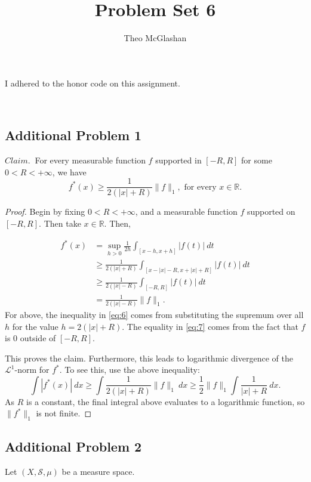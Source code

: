 \documentclass[12pt]{article}
\title{Problem Set 6}
\author{Theo McGlashan}
\date{}
\newcommand{\R}{\mathbb{R}}
\newcommand{\eq}[1]{\begin{equation*}#1\end{equation*}}
\newcommand{\qal}[1]{\begin{align}#1\end{align}}
\begin{document}
\maketitle

\begin{center}
    I adhered to the honor code on this assignment.
\end{center}

\newpage
\
\newpage

\subsection*{Additional Problem 1}

$Claim.~$ For every measurable function $f$ supported in $[-R, R]$ for some $0 < R < +\infty$, we have 
\eq{f^*(x) \geq \frac{1}{2(|x| + R)} \|f\|_1, \text{ for every } x \in \R.}

\begin{proof}
    Begin by fixing $0 < R < +\infty$, and a measurable function $f$ supported on $[-R, R]$. Then take $x \in \R$. Then,

    \qal{ f^*(x) &= \sup_{h > 0} \frac{1}{2h} \int_{[x-h, x+h]} |f(t)|~dt \nonumber \\
    & \geq \frac{1}{2(|x| + R)} \int_{[x - |x| - R, x + |x| + R]} |f(t)| ~dt \label{eq:6} \\
    & \geq \frac{1}{2(|x| - R)}\int_{[-R, R]} |f(t)| ~dt \nonumber \\
    & = \frac{1}{2(|x| - R)} \|f\|_1 \label{eq:7}.}
    For above, the inequality in \eqref{eq:6} comes from substituting the supremum over all $h$ for the value $h = 2(|x| + R)$. The equality in \eqref{eq:7} comes from the fact that $f$ is 0 outside of $[-R, R]$.

    This proves the claim. Furthermore, this leads to logarithmic divergence of the $\mathcal{L}^1$-norm for $f^*$. To see this, use the above inequality:
    \eq{\int |f^*(x)| ~dx \geq \int \frac{1}{2(|x| + R)}\|f\|_1~ dx \geq \frac{1}{2} \|f\|_1 \int \frac{1}{|x| + R} ~dx.}
    As $R$ is a constant, the final integral above evaluates to a logarithmic function, so $\|f^*\|_1$ is not finite.
\end{proof}

\subsection*{Additional Problem 2}

Let $(X, \mathcal{S}, \mu)$ be a measure space.
\end{document}
